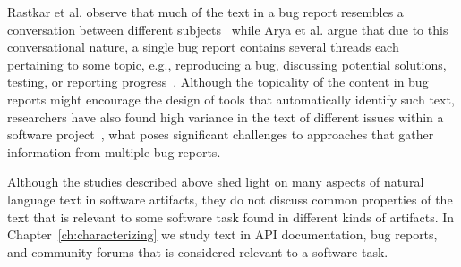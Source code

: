 Rastkar et al. observe that much of the text in a bug report resembles a 
conversation between different subjects~\cite{Rastkar2013} 
while Arya et al. argue that due to this conversational nature, 
a single bug report contains several threads each 
pertaining to some topic, e.g., 
reproducing a bug, discussing potential solutions, 
testing, or reporting progress~\cite{Arya2019}. 
Although the topicality of the content in bug reports 
might encourage the design of tools that automatically identify such
text, researchers have also found high variance in the text of different 
issues within a software project~\cite{Chaparro2016},
what poses significant challenges to approaches that 
gather information from multiple bug reports.



Although the studies described above shed light on many 
aspects of natural language text in software artifacts, 
they do not discuss common properties of the text 
that is relevant to some software task
found in different kinds of artifacts.
In Chapter~\ref{ch:characterizing}
we study text in API documentation, bug reports, and community forums that is considered relevant to a software task.











